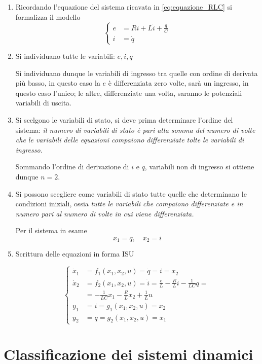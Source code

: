 \begin{enumerate}
\item Ricordando l'equazione del sistema ricavata in \ref{eq:equazione_RLC}
si formalizza il modello
\begin{equation}\left\{
\begin{aligned}
 e &= R i + L\dot{i} + \frac{q}{C}\\
 i &= \dot{q}
\end{aligned}\right.\end{equation}
\item Si individuano tutte le variabili: $e,i,q$

Si individuano dunque le variabili di ingresso tra quelle con ordine di derivata più basso, in
questo caso la $e$ è differenziata zero volte, sarà un ingresso, in questo caso l'unico; le altre,
differenziate una volta, saranno le potenziali variabili di uscita.
\item Si scelgono le variabili di stato, si deve prima determinare l'ordine del sistema:\newline
\emph{il
numero di variabili di stato è pari alla somma del numero di volte che le variabili delle equazioni
compaiono differenziate tolte le variabili di ingresso.}

Sommando l'ordine di derivazione di $i$ e $q$, variabili non di ingresso si ottiene dunque $n=2$.

\item Si possono scegliere come variabili di stato tutte quelle che determinano le condizioni
iniziali, ossia\newline
\emph{tutte le variabili che compaiono differenziate e in numero pari al numero di volte
in cui viene differenziata.}

Per il sistema in esame
$$
x_1 = q,\quad x_2 = i
$$
\item Scrittura delle equazioni in forma ISU

$$
\left\{\begin{aligned}
\dot{x}_1 &= f_1\left(x_1,x_2,u\right) = \dot{q} = i = x_2\\
\dot{x}_2 &=f_2(x_1,x_2,u) = \dot{i} = \frac{e}{L} - \frac{R}{L}i-\frac{1}{LC}q =\\
&= -\frac{1}{LC}x_1 - \frac{R}{L}x_2 + \frac{1}{L}u\\
y_1 &= i = g_1(x_1,x_2,u)=x_2\\
y_2 &=q = g_2(x_1,x_2,u)=x_1
\end{aligned}\right.
$$
\end{enumerate}

\section{Classificazione dei sistemi dinamici}
